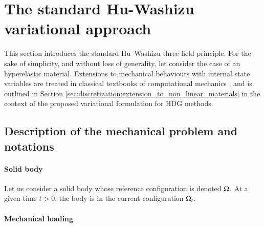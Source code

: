 \section{The standard Hu-Washizu variational approach}
\label{sec_model_problem}

This section introduces the standard Hu–Washizu three field
principle. For the sake of simplicity, and without loss of generality,
let consider the case of an hyperelastic material. Extensions to
mechanical behaviours with internal state variables are treated in
classical textbooks of computational mechanics
\cite{belytschko_nonlinear_nodate,besson_non-linear_2010}, and is outlined in Section \ref{sec:discretization:extension_to_non_linear_materials}
in the context of the proposed variational formulation for HDG methods.

\subsection{Description of the mechanical problem and notations}

\paragraph{Solid body}

Let us consider a solid body whose reference configuration is denoted
$\Omega$. At a given time $t > 0$, the body is in the current
configuration $\Omega_t$.

\paragraph{Mechanical loading}

